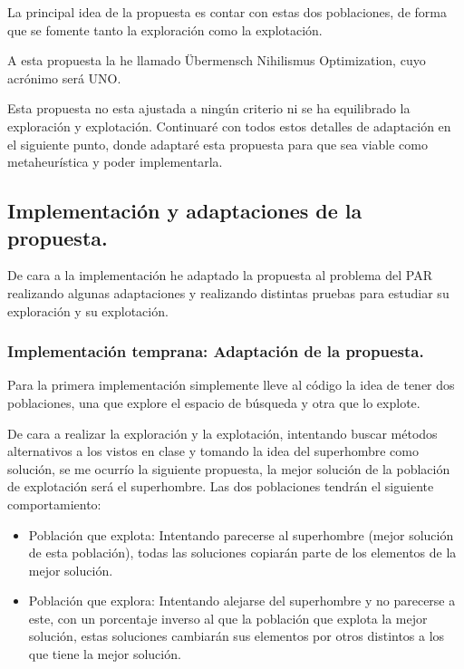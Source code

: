 \documentclass[12pt, spanish]{article}
\begin{document}
La principal idea de la propuesta es contar con estas dos poblaciones, de forma que se fomente tanto la exploración como la explotación.

A esta propuesta la he llamado Übermensch Nihilismus Optimization, cuyo acrónimo será UNO.

Esta propuesta no esta ajustada a ningún criterio ni se ha equilibrado la exploración y explotación. Continuaré con todos estos detalles de adaptación en el siguiente punto, donde adaptaré esta propuesta para que sea viable como metaheurística y poder implementarla.
 
 
 

\subsection{Implementación y adaptaciones de la propuesta.}

De cara a la implementación he adaptado la propuesta al problema del PAR realizando algunas adaptaciones y realizando distintas pruebas para estudiar su exploración y su explotación.

\subsubsection{Implementación temprana: Adaptación de la propuesta.}

Para la primera implementación simplemente lleve al código la idea de tener dos poblaciones, una que explore el espacio de búsqueda y otra que lo explote.

De cara a realizar la exploración y la explotación, intentando buscar métodos alternativos a los vistos en clase y tomando la idea del superhombre como solución, se me ocurrío la siguiente propuesta, la mejor solución de la población de explotación será el superhombre. Las dos poblaciones tendrán el siguiente comportamiento:

\begin{itemize}
	\item Población que explota: Intentando parecerse al superhombre (mejor solución de esta población), todas las soluciones copiarán parte de los elementos de la mejor solución.
	\item Población que explora: Intentando alejarse del superhombre y no parecerse a este, con un porcentaje inverso al que la población que explota la mejor solución, estas soluciones cambiarán sus elementos por otros distintos a los que tiene la mejor solución.
\end{itemize} 
\end{document}
